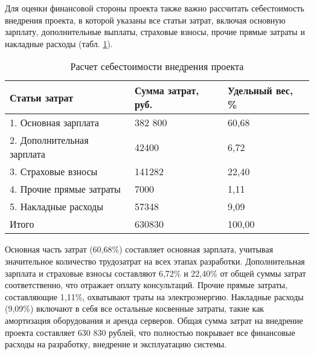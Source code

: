 \documentclass{report}
\begin{document}
Для оценки финансовой стороны проекта также важно рассчитать себестоимость внедрения проекта, в которой указаны все статьи затрат, включая основную зарплату, дополнительные выплаты, страховые взносы, прочие прямые затраты и накладные расходы (табл. \ref{table:table23}).

\renewcommand{\arraystretch}{1}
\begin{table}[H]
    \centering   %
    \caption{Расчет себестоимости внедрения проекта}    %
    \begin{tabular}{|m{6.9cm}|m{4.4cm}|m{4cm}|}        %
    \hline   %
    \centering\arraybackslash Статьи затрат & \centering\arraybackslash Сумма затрат, руб. & \centering\arraybackslash Удельный вес, \% \\ \hline
    1. Основная зарплата & 382 800 & 60,68 \\ \hline
    2. Дополнительная зарплата & 42400 & 6,72 \\ \hline
    3. Страховые взносы & 141282 & 22,40 \\ \hline
    4. Прочие прямые затраты & 7000 & 1,11 \\ \hline
    5. Накладные расходы & 57348 & 9,09 \\ \hline
    Итого & 630830 & 100,00 \\ \hline
    \end{tabular}
    \label{table:table23}
\end{table}

Основная часть затрат (60,68\%) составляет основная зарплата, учитывая значительное количество трудозатрат на всех этапах разработки. Дополнительная зарплата и страховые взносы составляют 6,72\% и 22,40\% от общей суммы затрат соответственно, что отражает оплату консультаций. Прочие прямые затраты, составляющие 1,11\%, охватывают траты на электроэнергию. Накладные расходы (9,09\%) включают в себя все остальные косвенные затраты, такие как амортизация оборудования и аренда серверов. Общая сумма затрат на внедрение проекта составляет 630 830 рублей, что полностью покрывает все финансовые расходы на разработку, внедрение и эксплуатацию системы.
\end{document}
